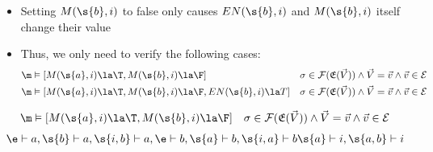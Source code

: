 \begin{frame}
    \begin{itemize}
        \item Setting $M(\s{b},i)$ to false only causes $EN(\s{b},i)$ and $M(\s{b},i)$ itself change their value
        \item Thus, we only need to verify the following cases:
              {\scriptsize
              \begin{align*}
                  \m & \vDash[M(\s{a},i)\la \T,M(\s{b},i)\la \F]
                     & \sigma \in \mathcal{F}(\mathfrak{E}(\vec V))
                  \wedge \vec V = \vec v \wedge \vec v \in \mathcal
                  {E}                                                                                                            \\
                  \m & \vDash[M(\s{a},i)\la \T,M(\s{b},i)\la \F,EN(\s{b},i)\la T] & \sigma \in \mathcal{F}(\mathfrak{E}(\vec V))
                  \wedge \vec V = \vec v \wedge \vec v \in \mathcal{E}
              \end{align*}
              }
    \end{itemize}
\end{frame}

\begin{frame}
    \begin{align*}
        \m & \vDash[M(\s{a},i)\la \T,M(\s{b},i)\la \F] & \sigma \in \mathcal{F}(\mathfrak{E}(\vec V))
        \wedge \vec V = \vec v \wedge \vec v \in \mathcal{E}                                          \\
    \end{align*}
    \begin{align*}
        \e \vdash a, \s{b} \vdash a, \s{i,b} \vdash a,
        \e \vdash b, \s{a} \vdash b, \s{i,a} \vdash b
        \s{a} \vdash i, \s{a,b} \vdash i
    \end{align*}

    \begin{center}
    \end{center}
\end{frame}

